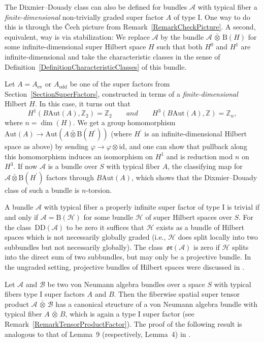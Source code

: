 \documentclass[11pt]{article}
\numberwithin{equation}{section}
\numberwithin{equation}{section}
\newcommand{\Z}{\mathbb{Z}}
\newcommand{\B}{\mathrm{B}}
\newcommand{\Aut}{\mathrm{Aut}}
\newcommand{\DD}{\mathrm{DD}}
\newcommand{\oclass}{\mathfrak{or}}
\begin{document}
The Dixmier--Douady class can also be defined for bundles $\mathcal{A}$ with typical fiber a \emph{finite-dimensional} non-trivially graded super factor $A$ of type I.
One way to do this is through the \v{C}ech picture from Remark~\ref{RemarkCheckPicture}.
A second, equivalent, way is via stabilization: We replace $\mathcal{A}$ by the bundle $\mathcal{A} \,\bar{\otimes}\, \B(H)$ for some infinite-dimensional super Hilbert space $H$ such that both $H^0$ and $H^1$ are infinite-dimensional and take the characteristic classes in the sense of Definition~\ref{DefinitionCharacteristicClasses} of this bundle.

\begin{Remark}
Let $A = A_{\mathrm{ev}}$ or $A_{\mathrm{odd}}$ be one of the super factors from Section~\ref{SectionSuperFactors}, constructed in terms of a \emph{finite-dimensional} Hilbert $H$.
In this case, it turns out that
\[H^1(B\Aut(A), \Z_2) = \Z_2\qquad and \qquad H^3(B\Aut(A), \Z) = \Z_n,\]
 where $n = \dim(H)$.
We get a group homomorphism $\Aut(A) \to \Aut(A \bar{\otimes} \B(H^\prime))$ (where $H^\prime$ is an infinite-dimensional Hilbert space as above) by sending $\varphi \to \varphi \otimes \mathrm{id}$, and one can show that pullback along this homomorphism induces an isomorphism on $H^1$ and is reduction mod $n$ on~$H^3$.
If now $\mathcal{A}$ is a bundle over $S$ with typical fiber $A$, the classifying map for $\mathcal{A} \bar{\otimes} \B(H^\prime)$ factors through $B\Aut(A)$, which shows that the Dixmier--Douady class of such a bundle is $n$-torsion.
\end{Remark}

\begin{Remark}
A bundle $\mathcal{A}$ with typical fiber a properly infinite super factor of type I is trivial if and only if $\mathcal{A} = \B(\mathcal{H})$ for some bundle $\mathcal{H}$ of super Hilbert spaces over $S$.
For the class~$\DD(\mathcal{A})$ to be zero it suffices that $\mathcal{H}$ exists as a bundle of Hilbert spaces which is not necessarily globally graded (i.e., $\mathcal{H}$ does split locally into two subbundles but not necessarily globally).
The class~$\oclass(\mathcal{A})$ is zero if $\mathcal{H}$ splits into the direct sum of two subbundles, but may only be a projective bundle.
In the ungraded setting, projective bundles of Hilbert spaces were discussed in \cite{AtiyahSegalTwistedKtheory}.
\end{Remark}

Let $\mathcal{A}$ and $\mathcal{B}$ be two von Neumann algebra bundles over a space $S$ with typical fibers type I super factors $A$ and $B$.
Then the fiberwise spatial super tensor product $\mathcal{A} \,\bar{\otimes}\, \mathcal{B}$ has a canonical structure of a von Neumann algebra bundle with typical fiber $A \,\bar{\otimes}\, B$, which is again a type I super factor (see Remark~\ref{RemarkTensorProductFactor}).
The proof of the following result is analogous to that of Lemma~9 (respectively, Lemma~4) in \cite{DonovanKaroubi}.
\end{document}
